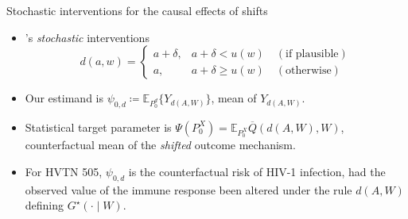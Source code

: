 \documentclass{beamer}
\newcommand{\E}{\mathbb{E}}
\begin{document}

\begin{frame}[c]{Stochastic interventions for the causal effects of shifts}

\begin{center}
\begin{itemize}
  \itemsep10pt
  \item \cite{diaz2012population, diaz2018stochastic}'s \textit{stochastic}
    interventions
     \begin{equation*}\label{shift_intervention}
       d(a, w) =
         \begin{cases}
           a + \delta, & a + \delta < u(w) \quad (\text{if plausible}) \\
           a, & a + \delta \geq u(w) \quad (\text{otherwise})
         \end{cases}
     \end{equation*}
  \item Our estimand is $\psi_{0, d} \coloneqq \E_{P_0^d}\{Y_{d(A,W)}\}$, mean
    of $Y_{d(A, W)}$.
  \item Statistical target parameter is
    $\Psi(P_0^X) = \E_{P_0^X}{\overline{Q}(d(A, W), W)}$, counterfactual mean
    of the \textit{shifted} outcome mechanism.
  \item For HVTN 505, $\psi_{0,d}$ is the counterfactual risk of HIV-1
    infection, had the observed value of the immune response been altered under
    the rule $d(A,W)$ defining $G^{\star}(\cdot \mid W)$.
\end{itemize}
\end{center}


\end{frame}

\end{document}
